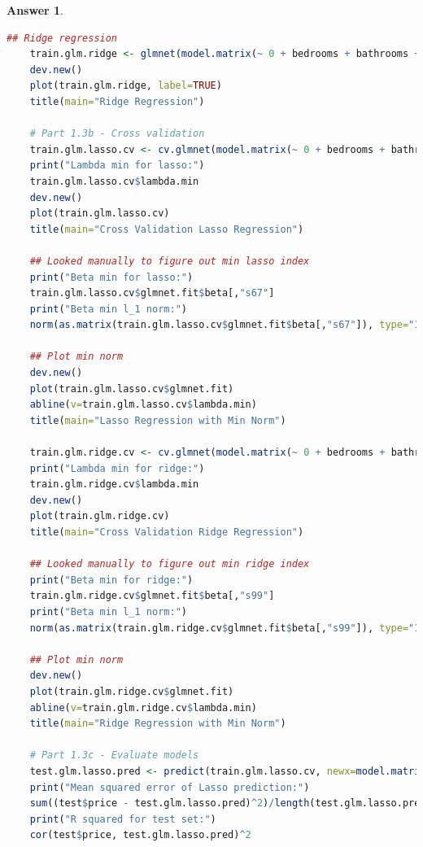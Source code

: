 \documentclass[12pt]{article}
\theoremstyle{colon}
\newtheorem*{answer}{Answer}
\begin{document}
\begin{answer}
\begin{lstlisting}[language=R, basicstyle=\scriptsize, breaklines=true]
    ## Ridge regression
    train.glm.ridge <- glmnet(model.matrix(~ 0 + bedrooms + bathrooms + sqft_living + sqft_lot + floors + waterfront + view + condition + grade + sqft_above + sqft_basement + yr_built + yr_renovated + zipcode + lat + long + sqft_living15 + sqft_lot15, data=train), data.matrix(train$price), alpha=0)
    dev.new()
    plot(train.glm.ridge, label=TRUE)
    title(main="Ridge Regression")

    # Part 1.3b - Cross validation
    train.glm.lasso.cv <- cv.glmnet(model.matrix(~ 0 + bedrooms + bathrooms + sqft_living + sqft_lot + floors + waterfront + view + condition + grade + sqft_above + sqft_basement + yr_built + yr_renovated + zipcode + lat + long + sqft_living15 + sqft_lot15, data=train), data.matrix(train$price), alpha=1, nfolds=5)
    print("Lambda min for lasso:")
    train.glm.lasso.cv$lambda.min
    dev.new()
    plot(train.glm.lasso.cv)
    title(main="Cross Validation Lasso Regression")

    ## Looked manually to figure out min lasso index
    print("Beta min for lasso:")
    train.glm.lasso.cv$glmnet.fit$beta[,"s67"]
    print("Beta min l_1 norm:")
    norm(as.matrix(train.glm.lasso.cv$glmnet.fit$beta[,"s67"]), type="1")

    ## Plot min norm
    dev.new()
    plot(train.glm.lasso.cv$glmnet.fit)
    abline(v=train.glm.lasso.cv$lambda.min)
    title(main="Lasso Regression with Min Norm")

    train.glm.ridge.cv <- cv.glmnet(model.matrix(~ 0 + bedrooms + bathrooms + sqft_living + sqft_lot + floors + waterfront + view + condition + grade + sqft_above + sqft_basement + yr_built + yr_renovated + zipcode + lat + long + sqft_living15 + sqft_lot15, data=train), data.matrix(train$price), alpha=0, nfolds=5)
    print("Lambda min for ridge:")
    train.glm.ridge.cv$lambda.min
    dev.new()
    plot(train.glm.ridge.cv)
    title(main="Cross Validation Ridge Regression")

    ## Looked manually to figure out min ridge index
    print("Beta min for ridge:")
    train.glm.ridge.cv$glmnet.fit$beta[,"s99"]
    print("Beta min l_1 norm:")
    norm(as.matrix(train.glm.ridge.cv$glmnet.fit$beta[,"s99"]), type="1")

    ## Plot min norm
    dev.new()
    plot(train.glm.ridge.cv$glmnet.fit)
    abline(v=train.glm.ridge.cv$lambda.min)
    title(main="Ridge Regression with Min Norm")

    # Part 1.3c - Evaluate models
    test.glm.lasso.pred <- predict(train.glm.lasso.cv, newx=model.matrix(~ 0 + bedrooms + bathrooms + sqft_living + sqft_lot + floors + waterfront + view + condition + grade + sqft_above + sqft_basement + yr_built + yr_renovated + zipcode + lat + long + sqft_living15 + sqft_lot15, data=test), s="lambda.min")
    print("Mean squared error of Lasso prediction:")
    sum((test$price - test.glm.lasso.pred)^2)/length(test.glm.lasso.pred)
    print("R squared for test set:")
    cor(test$price, test.glm.lasso.pred)^2


\end{lstlisting}
\end{answer}
\end{document}
